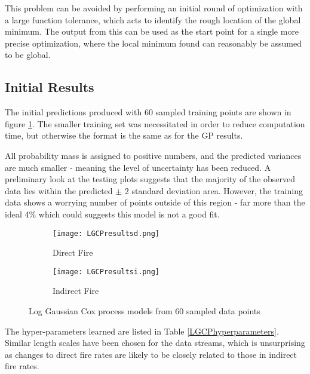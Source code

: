 \documentclass[a4paper,11pt]{report}
\begin{document}
This problem can be avoided by performing an initial round of optimization with a large function tolerance, which acts to identify the rough location of the global minimum. The output from this can be used as the start point for a single more precise optimization, where the local minimum found can reasonably be assumed to be global.


\subsection{Initial Results}

The initial predictions produced with 60 sampled training points are shown in figure \ref{fig:LGCPresults}. The smaller training set was necessitated in order to reduce computation time, but otherwise the format is the same as for the GP results. \par

All probability mass is assigned to positive numbers, and the predicted variances are much smaller - meaning the level of uncertainty has been reduced. A preliminary look at the testing plots suggests that the majority of the observed  data lies within the predicted \(\pm\) 2 standard deviation area. However, the training data shows a worrying number of points outside of this region - far more than the ideal 4\% which could suggests this model is not a good fit. 

\par
\begin{figure}
\centering
\begin{subfigure}{.5\textwidth}
	\centering
	\texttt{[image: LGCPresultsd.png]}
  	\caption{Direct Fire}
\end{subfigure}%
\begin{subfigure}{.5\textwidth}
  	\centering
  	\texttt{[image: LGCPresultsi.png]}
  	\caption{Indirect Fire}
\end{subfigure}
\caption{Log Gaussian Cox process models from 60 sampled data points}
\label{fig:LGCPresults}
\end{figure}

The hyper-parameters learned are listed in Table \ref{LGCPhyperparameters}. Similar length scales have been chosen for the data streams, which is unsurprising as changes to direct fire rates are likely to be closely related to those in indirect fire rates. 

\end{document}
